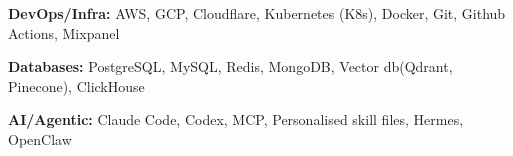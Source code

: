 \documentclass[10pt,a4paper]{article}
\begin{document}
\textbf{DevOps/Infra:} AWS, GCP, Cloudflare, Kubernetes (K8s), Docker, Git, Github Actions, Mixpanel

\textbf{Databases:} PostgreSQL, MySQL, Redis, MongoDB, Vector db(Qdrant, Pinecone), ClickHouse

\textbf{AI/Agentic:} Claude Code, Codex, MCP, Personalised skill files, Hermes, OpenClaw


\vspace{0pt plus 60pt} %
\pagebreak %
\end{document}
